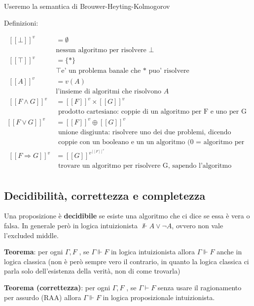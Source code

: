 \documentclass[
  a4paper,
]{article}
\begin{document}
Useremo la semantica di Brouwer-Heyting-Kolmogorov

Definizioni:

\[
\begin{aligned}
\; [[\bot]]^v & = \emptyset \\[6pt]
\; & \text{nessun algoritmo per risolvere } \bot \\[6pt]
\; [[\top]]^v & = \{*\} \\[6pt]
\; & \top \text{e' un problema banale che * puo' risolvere} \\[6pt]
\; [[A]]^v & = v(A) & \\[6pt]
\; & \text{l'insieme di algoritmi che risolvono } A \\[6pt]
\; [[F \land G]]^v & = [[F]]^v \times [[G]]^v \\[6pt] 
\; & \text{ prodotto cartesiano: coppie di un algoritmo per F e uno per G} \\[6pt]
[[F \lor G]]^v & = [[F]]^v \oplus [[G]]^v  \\[6pt]
\; & \text{ unione disgiunta: risolvere uno dei due problemi, dicendo quale} \\[6pt]
\; & \text{ coppie con un booleano e un un algoritmo (0 = algoritmo per F, 1 = algoritmo per G)} \\[6pt]
\;[[F \Rightarrow G]]^v & = [[G]]^{v^{[[F]]^v}} \\[6pt]
\; & \text{ trovare un algoritmo per risolvere G, sapendo l'algoritmo risolutivo di F} \\[6pt]
\end{aligned}
\]

\hypertarget{decidibilituxe0-correttezza-e-completezza}{%
\subsection{Decidibilità, correttezza e
completezza}\label{decidibilituxe0-correttezza-e-completezza}}

Una proposizione è \textbf{decidibile} se esiste una algoritmo che ci
dice se essa è vera o falsa. In generale però in logica intuizionista
\(\not \Vdash A \lor \neg A\), ovvero non vale l'excluded middle.

\textbf{Teorema}: per ogni \(\Gamma, F\) , se \(\Gamma \Vdash F\) in
logica intuizionista allora \(\Gamma \Vdash F\) anche in logica classica
(non è però sempre vero il contrario, in quanto la logica classica ci
parla solo dell'esistenza della verità, non di come trovarla)

\textbf{Teorema (correttezza)}: per ogni \(\Gamma, F\) , se
\(\Gamma \vdash F\) senza usare il ragionamento per assurdo (RAA) allora
\(\Gamma \Vdash F\) in logica proposizionale intuizionista.
\end{document}
